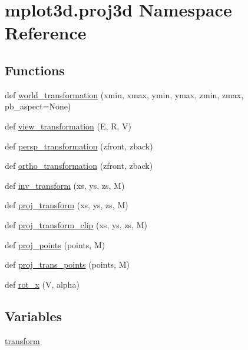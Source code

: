\hypertarget{namespacemplot3d_1_1proj3d}{}\section{mplot3d.\+proj3d Namespace Reference}
\label{namespacemplot3d_1_1proj3d}
\subsection*{Functions}
\begin{DoxyCompactItemize}
\item 
def \hyperlink{namespacemplot3d_1_1proj3d_a7f12ed00fb7310006b4a8fa48d121597}{world\+\_\+transformation} (xmin, xmax, ymin, ymax, zmin, zmax, pb\+\_\+aspect=None)
\item 
def \hyperlink{namespacemplot3d_1_1proj3d_ad0cac9544a91b97ea52fde44db35b499}{view\+\_\+transformation} (E, R, V)
\item 
def \hyperlink{namespacemplot3d_1_1proj3d_a91377dab1e231cdb3ce726ede73c7c46}{persp\+\_\+transformation} (zfront, zback)
\item 
def \hyperlink{namespacemplot3d_1_1proj3d_a71d108ecc783bbece5883cf64f2255ff}{ortho\+\_\+transformation} (zfront, zback)
\item 
def \hyperlink{namespacemplot3d_1_1proj3d_a0e80860a702137292ec9bc2ea0f237f8}{inv\+\_\+transform} (xs, ys, zs, M)
\item 
def \hyperlink{namespacemplot3d_1_1proj3d_a00efff4eacf5c766dc4ffa289e483402}{proj\+\_\+transform} (xs, ys, zs, M)
\item 
def \hyperlink{namespacemplot3d_1_1proj3d_af5fe5a4a5fbffdfcd581d58ce977eb41}{proj\+\_\+transform\+\_\+clip} (xs, ys, zs, M)
\item 
def \hyperlink{namespacemplot3d_1_1proj3d_a4e304c1757120bf69af73e041b5e3bc9}{proj\+\_\+points} (points, M)
\item 
def \hyperlink{namespacemplot3d_1_1proj3d_a911b2f09bc3120036cf36465b8597ed0}{proj\+\_\+trans\+\_\+points} (points, M)
\item 
def \hyperlink{namespacemplot3d_1_1proj3d_a8f39e24cd1fed69169deab559e1e628e}{rot\+\_\+x} (V, alpha)
\end{DoxyCompactItemize}
\subsection*{Variables}
\begin{DoxyCompactItemize}
\item 
\hyperlink{namespacemplot3d_1_1proj3d_ab2c99fedc5ee15b2841e9338fbc5d541}{transform}
\end{DoxyCompactItemize}


